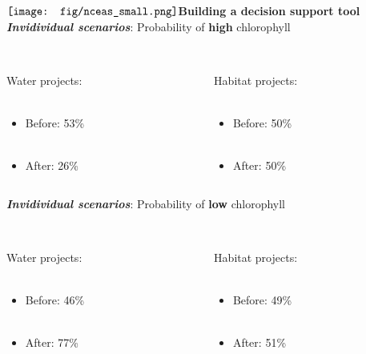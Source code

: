 \documentclass[serif]{beamer}\usepackage[]{graphicx}\usepackage[]{color}
\newcommand{\emtxt}[1]{\textbf{\textit{{\color{mypal4} #1}}}}
\begin{document}
\begin{frame}{{$\vcenter{\hbox{\texttt{[image: fig/nceas\_small.png]}}}$\hspace{0.07in}\textbf{Building a decision support tool}}}
\emtxt{Invidividual scenarios}: Probability of \textbf{high} chlorophyll\\~\\
\begin{columns}
\begin{column}{0.5\textwidth}
Water projects: \\~\\
\begin{itemize}
\item Before: 53\% \\~\\
\item After: 26\%
\end{itemize}
\end{column}
\begin{column}{0.5\textwidth}
Habitat projects: \\~\\
\begin{itemize}
\item Before: 50\% \\~\\
\item After: 50\%
\end{itemize}
\end{column}
\end{columns}
\vspace{0.2in}
\emtxt{Invidividual scenarios}: Probability of \textbf{low} chlorophyll\\~\\
\begin{columns}
\begin{column}{0.5\textwidth}
Water projects: \\~\\
\begin{itemize}
\item Before: 46\% \\~\\
\item After: 77\%
\end{itemize}
\end{column}
\begin{column}{0.5\textwidth}
Habitat projects: \\~\\
\begin{itemize}
\item Before: 49\% \\~\\
\item After: 51\%
\end{itemize}
\end{column}
\end{columns}
\end{frame}
\end{document}
